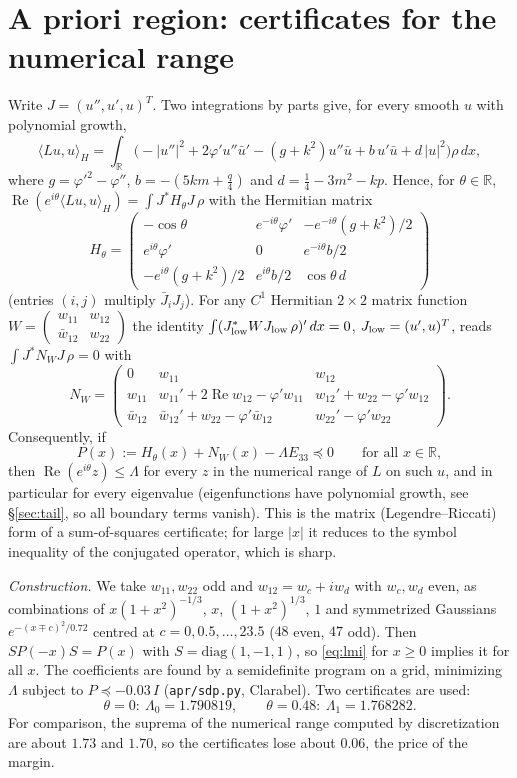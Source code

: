 \documentclass[11pt]{amsart}
\theoremstyle{remark}
\newcommand{\R}{\mathbb{R}}
\newcommand{\ip}[2]{\langle #1,#2\rangle}
\newcommand{\re}{\operatorname{Re}}
\begin{document}
\section{A priori region: certificates for the numerical range}\label{sec:apriori}
Write $J=(u'',u',u)^T$. Two integrations by parts give, for every smooth $u$ with polynomial growth,
\[
\ip{Lu}{u}_H=\int_\R\Big(-|u''|^2+2\varphi'u''\bar u'-(g+k^2)u''\bar u+b\,u'\bar u+d\,|u|^2\Big)\rho\,dx,
\]
where $g=\varphi'^2-\varphi''$, $b=-(5km+\frac q4)$ and $d=\frac14-3m^2-kp$. Hence, for $\theta\in\R$, $\re(e^{i\theta}\ip{Lu}{u}_H)=\int J^*H_\theta J\,\rho$ with the Hermitian matrix
\[
H_\theta=\begin{pmatrix}-\cos\theta& e^{-i\theta}\varphi'& -e^{-i\theta}(g+k^2)/2\\ e^{i\theta}\varphi'&0& e^{-i\theta}b/2\\ -e^{i\theta}(g+k^2)/2& e^{i\theta}b/2&\cos\theta\, d\end{pmatrix}
\]
(entries $(i,j)$ multiply $\bar J_iJ_j$). For any $C^1$ Hermitian $2\times2$ matrix function $W=\begin{pmatrix}w_{11}&w_{12}\\ \bar w_{12}&w_{22}\end{pmatrix}$ the identity $\int(J_{\rm low}^*WJ_{\rm low}\,\rho)'\,dx=0$, $J_{\rm low}=(u',u)^T$, reads $\int J^*N_WJ\,\rho=0$ with
\[
N_W=\begin{pmatrix}0&w_{11}&w_{12}\\ w_{11}&w_{11}'+2\re w_{12}-\varphi'w_{11}&w_{12}'+w_{22}-\varphi'w_{12}\\ \bar w_{12}&\bar w_{12}'+w_{22}-\varphi'\bar w_{12}&w_{22}'-\varphi'w_{22}\end{pmatrix}.
\]
Consequently, if
\begin{equation}\label{eq:lmi}
P(x):=H_\theta(x)+N_W(x)-\Lambda E_{33}\preceq0\qquad\text{for all }x\in\R,
\end{equation}
then $\re(e^{i\theta}z)\le\Lambda$ for every $z$ in the numerical range of $L$ on such $u$, and in particular for every eigenvalue (eigenfunctions have polynomial growth, see \S\ref{sec:tail}, so all boundary terms vanish). This is the matrix (Legendre--Riccati) form of a sum-of-squares certificate; for large $|x|$ it reduces to the symbol inequality of the conjugated operator, which is sharp.

\emph{Construction.} We take $w_{11},w_{22}$ odd and $w_{12}=w_c+iw_d$ with $w_c,w_d$ even, as combinations of $x(1+x^2)^{-1/3}$, $x$, $(1+x^2)^{1/3}$, $1$ and symmetrized Gaussians $e^{-(x\mp c)^2/0.72}$ centred at $c=0,0.5,\dots,23.5$ ($48$ even, $47$ odd). Then $SP(-x)S=P(x)$ with $S=\mathrm{diag}(1,-1,1)$, so \eqref{eq:lmi} for $x\ge0$ implies it for all $x$. The coefficients are found by a semidefinite program on a grid, minimizing $\Lambda$ subject to $P\preceq-0.03\,I$ (\texttt{apr/sdp.py}, Clarabel). Two certificates are used:
\[
\theta=0:\ \Lambda_0=1.790819,\qquad \theta=0.48:\ \Lambda_1=1.768282 .
\]
For comparison, the suprema of the numerical range computed by discretization are about $1.73$ and $1.70$, so the certificates lose about $0.06$, the price of the margin.
\end{document}
